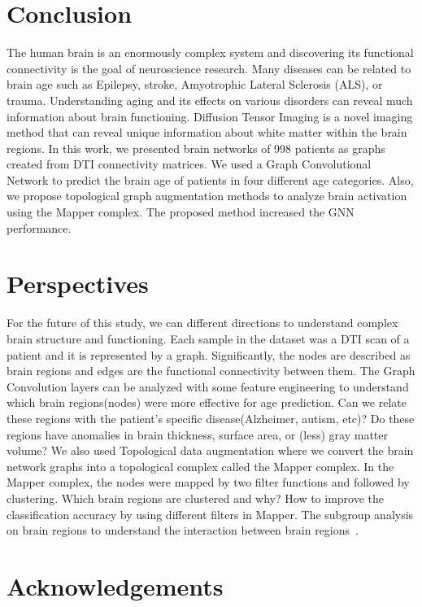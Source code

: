 \documentclass[runningheads]{llncs}
\begin{document}
\section{Conclusion}
The human brain is an enormously complex system and discovering its functional connectivity is the goal of neuroscience research. Many diseases can be related to brain age such as Epilepsy, stroke, Amyotrophic Lateral Sclerosis (ALS), or trauma. Understanding aging and its effects on various disorders can reveal much information about brain functioning. Diffusion Tensor Imaging is a novel imaging method that can reveal unique information about white matter within the brain regions. In this work, we presented brain networks of 998 patients as graphs created from DTI connectivity matrices. We used a Graph Convolutional Network to predict the brain age of patients in four different age categories. Also, we propose topological graph augmentation methods to analyze brain activation using the Mapper complex. The proposed method increased the GNN performance.


\section{Perspectives}
For the future of this study, we can different directions to understand complex brain structure and functioning. Each sample in the dataset was a DTI scan of a patient and it is represented by a graph. Significantly, the nodes are described as brain regions and edges are the functional connectivity between them. The Graph Convolution layers can be analyzed with some feature engineering to understand which brain regions(nodes) were more effective for age prediction. Can we relate these regions with the patient's specific disease(Alzheimer, autism, etc)? Do these regions have anomalies in brain thickness, surface area, or (less) gray matter volume?
We also used Topological data augmentation where we convert the brain network graphs into a topological complex called the Mapper complex. In the Mapper complex, the nodes were mapped by two filter functions and followed by clustering. Which brain regions are clustered and why? How to improve the classification accuracy by using different filters in Mapper. The subgroup analysis on brain regions to understand the interaction between brain regions~\cite{vallartatopological, nicolau2011topology}.
\section{Acknowledgements}
\end{document}
